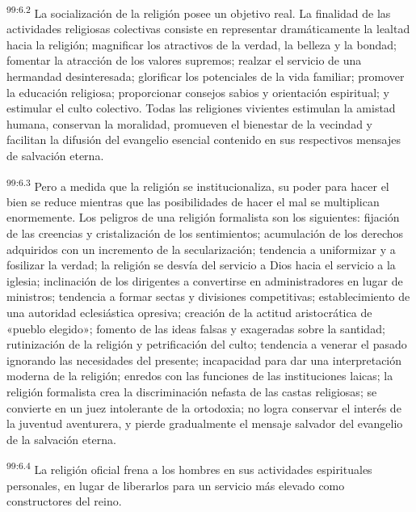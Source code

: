 \par
\textsuperscript{99:6.2} La socialización de la religión posee un objetivo real. La finalidad de las actividades religiosas colectivas consiste en representar dramáticamente la lealtad hacia la religión; magnificar los atractivos de la verdad, la belleza y la bondad; fomentar la atracción de los valores supremos; realzar el servicio de una hermandad desinteresada; glorificar los potenciales de la vida familiar; promover la educación religiosa; proporcionar consejos sabios y orientación espiritual; y estimular el culto colectivo. Todas las religiones vivientes estimulan la amistad humana, conservan la moralidad, promueven el bienestar de la vecindad y facilitan la difusión del evangelio esencial contenido en sus respectivos mensajes de salvación eterna.

\par
\textsuperscript{99:6.3} Pero a medida que la religión se institucionaliza, su poder para hacer el bien se reduce mientras que las posibilidades de hacer el mal se multiplican enormemente. Los peligros de una religión formalista son los siguientes: fijación de las creencias y cristalización de los sentimientos; acumulación de los derechos adquiridos con un incremento de la secularización; tendencia a uniformizar y a fosilizar la verdad; la religión se desvía del servicio a Dios hacia el servicio a la iglesia; inclinación de los dirigentes a convertirse en administradores en lugar de ministros; tendencia a formar sectas y divisiones competitivas; establecimiento de una autoridad eclesiástica opresiva; creación de la actitud aristocrática de «pueblo elegido»; fomento de las ideas falsas y exageradas sobre la santidad; rutinización de la religión y petrificación del culto; tendencia a venerar el pasado ignorando las necesidades del presente; incapacidad para dar una interpretación moderna de la religión; enredos con las funciones de las instituciones laicas; la religión formalista crea la discriminación nefasta de las castas religiosas; se convierte en un juez intolerante de la ortodoxia; no logra conservar el interés de la juventud aventurera, y pierde gradualmente el mensaje salvador del evangelio de la salvación eterna.

\par
\textsuperscript{99:6.4} La religión oficial frena a los hombres en sus actividades espirituales personales, en lugar de liberarlos para un servicio más elevado como constructores del reino.

